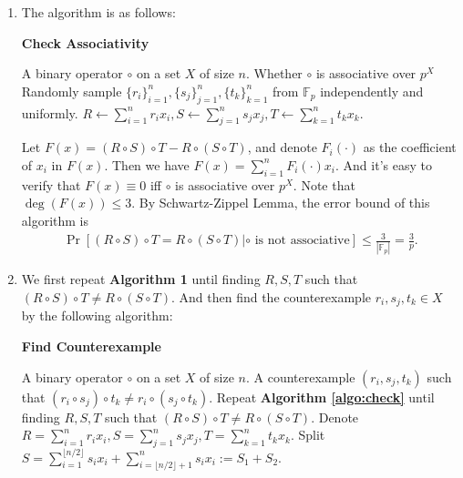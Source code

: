\begin{answer}
	\begin{enumerate}[label=\alph*).]
		\item The algorithm is as follows:
		\begin{algo}
			\caption{\textbf{Check Associativity}}
			\label{algo:check}
			\begin{algorithmic}[1]
				\Require A binary operator $\circ$ on a set $X$ of size $n$.
				\Ensure Whether $\circ$ is associative over $p^X$
				\State Randomly sample $\{r_i\}_{i=1}^n, \{s_j\}_{j=1}^n, \{t_k\}_{k=1}^n$ from $\mathbb{F}_p$ independently and uniformly.
				\State $R \leftarrow \sum_{i=1}^{n}r_ix_i, S \leftarrow \sum_{j=1}^{n}s_jx_j, T \leftarrow \sum_{k=1}^{n}t_kx_k$.
					\State \Return {}
				\Else 
					\State \Return {}
				\EndIf
			\end{algorithmic}
		\end{algo}
		Let $F(x) = (R\circ S)\circ T - R\circ(S\circ T)$, and denote $F_i(\cdot)$ as the coefficient of $x_i$ in $F(x)$. Then we have
			$F(x) = \sum_{i=1}^{n}F_i(\cdot)x_i. $
		And it's easy to verify that $F(x) \equiv 0$ iff $\circ$ is associative over $p^X$. Note that $\deg(F(x)) \le 3$. 
		By Schwartz-Zippel Lemma, the error bound of this algorithm is 
		\begin{align*}
			\Pr[(R\circ S)\circ T = R\circ (S\circ T)|\text{$\circ$ is not associative}] \le \frac{3}{|\mathbb{F}_p|} = \frac{3}{p}.
		\end{align*}
		\item We first repeat \textbf{Algorithm 1} until finding $R, S, T$ such that $(R\circ S)\circ T\neq R\circ(S\circ T)$. 
		And then find the counterexample $r_i, s_j, t_k \in X$ by the following algorithm:
		\begin{algo}
			\caption{\textbf{Find Counterexample}}
			\label{algo:find}
			\begin{algorithmic}[1]
				\Require A binary operator $\circ$ on a set $X$ of size $n$.
				\Ensure A counterexample $(r_i, s_j, t_k)$ such that $(r_i\circ s_j)\circ t_k\neq r_i\circ(s_j\circ t_k)$.
				\State Repeat \textbf{Algorithm \ref{algo:check}} until finding $R, S, T$ such that $(R\circ S)\circ T\neq R\circ(S\circ T)$.
				\State Denote $R = \sum_{i=1}^{n}r_ix_i, S = \sum_{j=1}^{n}s_jx_j, T = \sum_{k=1}^{n}t_kx_k$.
				 \Comment{$|R| := \#\{r_i|r_i \neq 0\}$, etc.}
					\State Split $S = \sum_{i=1}^{\lfloor n/2\rfloor}s_ix_i + \sum_{i=\lfloor n/2\rfloor+1}^{n}s_ix_i := S_1 + S_2$. \Comment {assume $|S| = \max\{|R|, |S|, |T|\}$}

\end{algorithmic}
\end{algo}
\end{enumerate}
\end{answer}
